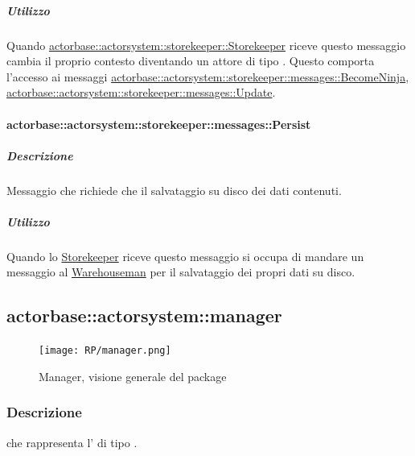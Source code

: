 \documentclass{scalatekids-article}
\begin{document}
\subparagraph{Utilizzo}
Quando \hyperref[sec:actorbase::actorsystem::storekeeper::Storekeeper]{actorbase::actorsystem::storekeeper::Storekeeper}
riceve questo messaggio cambia il proprio contesto diventando un attore di tipo . Questo comporta l'accesso ai messaggi
\hyperref[sec:actorbase::actorsystem::storekeeper::messages::BecomeNinja]{actorbase::\allowbreak{}actorsystem::\allowbreak{}storekeeper::\allowbreak{}messages::\allowbreak{}BecomeNinja},
\hyperref[sec:actorbase::actorsystem::storekeeper::messages::Update]{actorbase::\allowbreak{}actorsystem::\allowbreak{}storekeeper::\allowbreak{}messages::\allowbreak{}Update}.

\paragraph{actorbase::actorsystem::storekeeper::messages::Persist}
\label{sec:actorbase::actorsystem::storekeeper::messages::Persist}

\subparagraph{Descrizione}
Messaggio che richiede che il salvataggio su disco dei dati contenuti.

\subparagraph{Utilizzo}
Quando lo \hyperref[sec:actorbase::actorsystem::storekeeper::Storekeeper]{Storekeeper}
riceve questo messaggio si occupa di mandare un messaggio al \hyperref[sec:actorbase::actorsystem::warehouseman::Warehouseman]{Warehouseman}
per il salvataggio dei propri dati su disco.



\subsection{actorbase::actorsystem::manager}
\label{sec:actorbase::actorsystem::manager}

\begin{figure}[H]
  \begin{center}
    \texttt{[image: RP/manager.png]}
    \caption{Manager, visione generale del package}
  \end{center}
\end{figure}

\subsubsection{Descrizione}
 che rappresenta l' di tipo .
\end{document}
